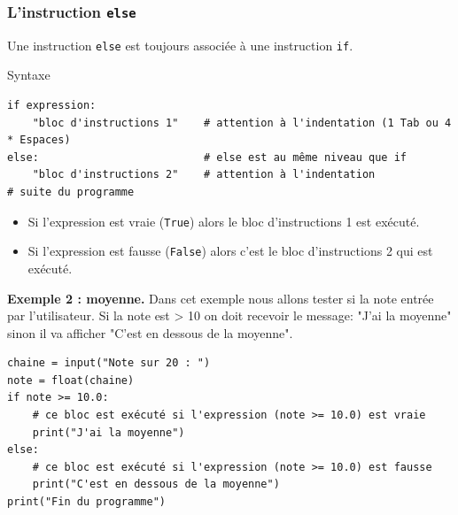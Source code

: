 \documentclass{beamer}
\begin{document}
\begin{frame}
\frametitle{L'instruction \texttt{else}}

Une instruction \texttt{else} est toujours associée à une instruction \texttt{if}.

\begin{block}{Syntaxe }

\begin{verbatim}
if expression:
    "bloc d'instructions 1"    # attention à l'indentation (1 Tab ou 4 * Espaces)
else:                          # else est au même niveau que if
    "bloc d'instructions 2"    # attention à l'indentation
# suite du programme
\end{verbatim}
\begin{itemize}
\item Si l'expression est vraie (\texttt{True}) alors le bloc d'instructions 1 est exécuté.

\item Si l'expression est fausse (\texttt{False}) alors c'est le bloc d'instructions 2 qui est exécuté.
\end{itemize}

\noindent
\end{block}
\end{frame}

\begin{frame}

\noindent\textbf{Exemple 2 : moyenne.}
Dans cet exemple nous allons tester si la note entrée par l'utilisateur. Si la note est > 10 on doit recevoir le message: "J'ai la moyenne" sinon il va afficher "C'est en dessous de la moyenne".

\begin{verbatim}
chaine = input("Note sur 20 : ")
note = float(chaine)
if note >= 10.0:
    # ce bloc est exécuté si l'expression (note >= 10.0) est vraie
    print("J'ai la moyenne")
else:
    # ce bloc est exécuté si l'expression (note >= 10.0) est fausse
    print("C'est en dessous de la moyenne")
print("Fin du programme")
\end{verbatim}
\end{frame}
\end{document}
